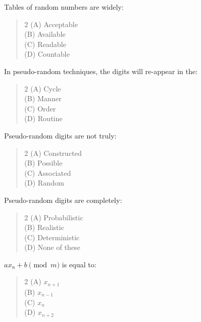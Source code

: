 \documentclass[11pt,a4paper]{article}
\begin{document}
\begin{mcqlist}
\item Tables of random numbers are widely:
\begin{quote}\begin{multicols}{2}
\noindent (A) Acceptable \\
(B) Available \\
(C) Readable \\
(D) Countable
\end{multicols}\end{quote}

\item In pseudo-random techniques, the digits will re-appear in the:
\begin{quote}\begin{multicols}{2}
\noindent (A) Cycle \\
(B) Manner \\
(C) Order \\
(D) Routine
\end{multicols}\end{quote}

\item Pseudo-random digits are not truly:
\begin{quote}\begin{multicols}{2}
\noindent (A) Constructed \\
(B) Possible \\
(C) Associated \\
(D) Random
\end{multicols}\end{quote}

\item Pseudo-random digits are completely:
\begin{quote}\begin{multicols}{2}
\noindent (A) Probabilistic \\
(B) Realistic \\
(C) Deterministic \\
(D) None of these
\end{multicols}\end{quote}

\item $ax_n+b \pmod{m}$ is equal to:
\begin{quote}\begin{multicols}{2}
\noindent (A) $x_{n+1}$ \\
(B) $x_{n-1}$ \\
(C) $x_n$ \\
(D) $x_{n+2}$
\end{multicols}\end{quote}


\end{mcqlist}
\end{document}
